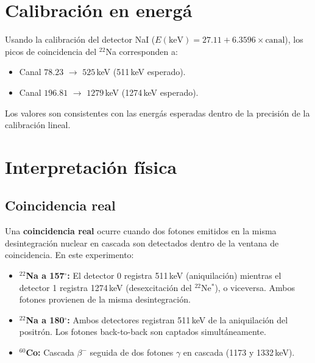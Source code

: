 \documentclass[12pt,a4paper]{article}
\begin{document}
\section{Calibraci\'on en energ\'a}

Usando la calibraci\'on del detector NaI ($E(\text{keV}) = 27.11 + 6.3596 \times \text{canal}$),
los picos de coincidencia del $^{22}$Na corresponden a:
\begin{itemize}
  \item Canal $78.23$ $\rightarrow$ $525$\,keV (511\,keV esperado).
  \item Canal $196.81$ $\rightarrow$ $1279$\,keV (1274\,keV esperado).
\end{itemize}
Los valores son consistentes con las energ\'as esperadas dentro de la precisi\'on
de la calibraci\'on lineal.

\section{Interpretaci\'on f\'isica}

\subsection{Coincidencia real}

Una \textbf{coincidencia real} ocurre cuando dos fotones emitidos en la misma desintegraci\'on
nuclear en cascada son detectados dentro de la ventana de coincidencia. En este experimento:
\begin{itemize}
  \item \textbf{$^{22}$Na a 157$^\circ$:} El detector 0 registra 511\,keV (aniquilaci\'on)
        mientras el detector 1 registra 1274\,keV (desexcitaci\'on del $^{22}$Ne$^*$),
        o viceversa. Ambos fotones provienen de la misma desintegraci\'on.
  \item \textbf{$^{22}$Na a 180$^\circ$:} Ambos detectores registran 511\,keV de la
        aniquilaci\'on del positr\'on. Los fotones back-to-back son captados simult\'aneamente.
  \item \textbf{$^{60}$Co:} Cascada $\beta^-$ seguida de dos fotones $\gamma$ en
        cascada (1173 y 1332\,keV).
\end{itemize}
\end{document}
